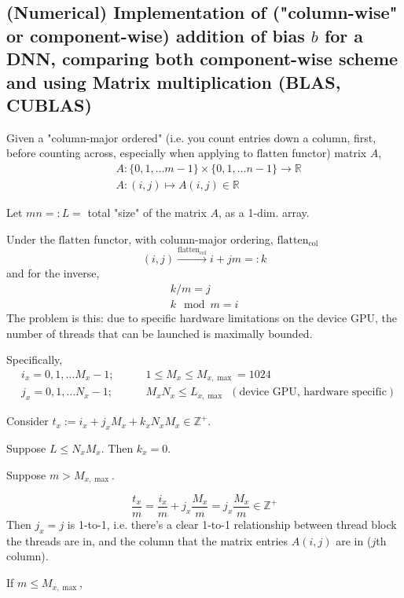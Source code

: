 \documentclass[10pt]{amsart}
\begin{document}
\begin{multicols*}{2}
\subsection{(Numerical) Implementation of ("column-wise" or component-wise) addition of bias $b$ for a DNN, comparing both component-wise scheme and using Matrix multiplication (BLAS, CUBLAS)}  

Given a "column-major ordered" (i.e. you count entries down a column, first, before counting across, especially when applying to $\text{flatten}$ functor) matrix $A$, 
\[
\begin{aligned}
	& A: \lbrace 0  ,1,\dots m-1 \rbrace \times \lbrace 0 ,1, \dots n-1 \rbrace \to \mathbb{R} \\
	& A: (i,j) \mapsto A(i,j) \in \mathbb{R}
\end{aligned}
\]

Let $mn =: L= $ total "size" of the matrix $A$, as a 1-dim. array.  

Under the $\text{flatten}$ functor, with column-major ordering, $\text{flatten}_{\text{col}}$
\[
(i,j) \xrightarrow{ \text{flatten}_{\text{col} } } i+jm = : k 
\]
and for the inverse, 
\[
\begin{gathered}
	k/m = j \\
	k \mod{m} = i
\end{gathered}
\]
The problem is this: due to specific hardware limitations on the device GPU, the number of threads that can be launched is maximally bounded.  

Specifically, 
\[
\begin{aligned}
	& i_x = 0,1,\dots M_x-1 ; \qquad & 1 \leq M_x \leq M_{x,\max} = 1024 \\ 
	& j_x = 0,1,\dots N_x-1 ; \qquad \, & M_xN_x \leq L_{x,\max} \  \   (\text{device GPU, hardware specific})
\end{aligned}
\]

Consider $t_x := i_x + j_x M_x + k_x N_x M_x \in \mathbb{Z}^+$.  

Suppose $L\leq N_x M_x$.  Then $k_x=0$.  

Suppose $m> M_{x,\max}$.  

\[
\frac{t_x}{m} = \frac{i_x}{m} + j_x \frac{M_x}{m} = j_x \frac{M_x}{m} \in \mathbb{Z}^+ 
\]
Then $j_x =j$ is 1-to-1, i.e. there's a clear 1-to-1 relationship between thread block the threads are in, and the column that the matrix entries $A(i,j)$ are in ($j$th column).  

If $m\leq M_{x,\max}$, \\


\end{multicols*}
\end{document}
